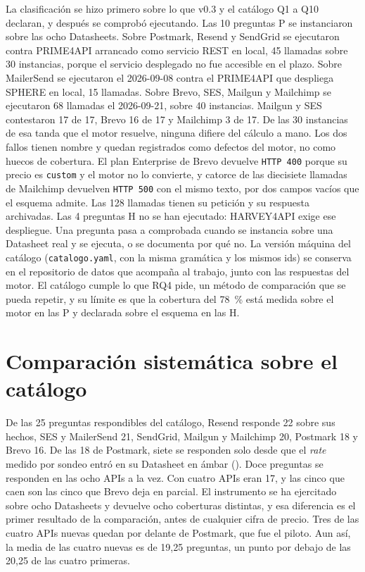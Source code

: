 La clasificación se hizo primero sobre lo que v0.3 y el catálogo Q1 a Q10 declaran, y
después se comprobó ejecutando. Las 10 preguntas P se instanciaron sobre las ocho
Datasheets. Sobre Postmark, Resend y SendGrid se ejecutaron contra PRIME4API arrancado como servicio REST en local, 45 llamadas sobre 30 instancias, porque el servicio desplegado no fue accesible
en el plazo. Sobre MailerSend se ejecutaron el 2026-09-08 contra el PRIME4API que
despliega SPHERE en local, 15 llamadas. Sobre Brevo, SES, Mailgun y Mailchimp se
ejecutaron 68 llamadas el 2026-09-21, sobre 40 instancias. Mailgun y SES contestaron 17
de 17, Brevo 16 de 17 y Mailchimp 3 de 17. De las 30 instancias de esa tanda que el motor resuelve, ninguna difiere del cálculo a mano.
Los dos fallos tienen nombre y quedan registrados como defectos del motor, no como
huecos de cobertura. El plan Enterprise de Brevo devuelve \texttt{HTTP 400} porque su
precio es \texttt{custom} y el motor no lo convierte, y catorce de las diecisiete
llamadas de Mailchimp devuelven \texttt{HTTP 500} con el mismo texto, por dos campos
vacíos que el esquema admite. Las 128 llamadas tienen su petición y su respuesta
archivadas. Las 4 preguntas H no se han ejecutado: HARVEY4API exige ese despliegue. Una
pregunta pasa a comprobada cuando se instancia sobre una Datasheet real y se ejecuta, o
se documenta por qué no. La versión máquina del catálogo (\texttt{catalogo.yaml}, con la
misma gramática y los mismos ids) se conserva en el repositorio de datos que acompaña al
trabajo, junto con las respuestas del motor. El catálogo cumple lo que RQ4 pide, un
método de comparación que se pueda repetir, y su límite es que la cobertura del 78~\%
está medida sobre el motor en las P y declarada sobre el esquema en las H.

\section{Comparación sistemática sobre el catálogo}
\label{sec:hallazgos:comparacion}

De las 25 preguntas respondibles del catálogo, Resend responde 22 sobre sus hechos, SES
y MailerSend 21, SendGrid, Mailgun y Mailchimp 20, Postmark 18 y Brevo 16. De las 18 de
Postmark, siete se responden solo desde que el \textit{rate} medido por sondeo entró en
su Datasheet en ámbar (\semambar{}). Doce preguntas se responden en las ocho APIs a la
vez. Con cuatro APIs eran 17, y las cinco que caen son las cinco que Brevo deja en
parcial. El instrumento se ha ejercitado sobre ocho Datasheets y devuelve ocho
coberturas distintas, y esa diferencia es el primer resultado de la comparación, antes
de cualquier cifra de precio. Tres de las cuatro APIs nuevas quedan por delante de Postmark, que fue el piloto.
Aun así, la media de las cuatro nuevas es de 19,25 preguntas, un punto por debajo de las 20,25 de las cuatro primeras.

